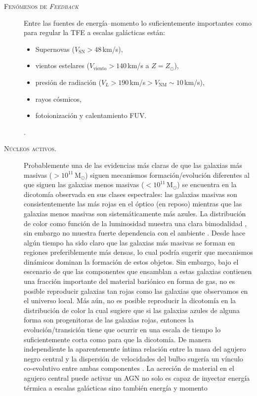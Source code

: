 \documentclass[xcolor=dvipsnames,4pt,hyperref={colorlinks,citecolor=black,linkcolor=black,urlcolor=black}]{beamer}
\begin{document}
\begin{frame}[allowframebreaks]{\textsc{Fenómenos de \emph{Feedback}}}
\begin{description}
Entre las fuentes de energía--momento lo suficientemente importantes como para regular la TFE a
escalas galácticas están:
%
\begin{itemize}
\item Supernovas ($V_\text{SN}>48\,$km/s),
\item vientos estelares ($V_\text{viento}>140\,$km/s a $Z=Z_\odot$),
\item presión de radiación ($V_L>190\,$km/s$>V_\text{NM}\sim10\,$km/s),
\item rayos cósmicos,
\item fotoionización y calentamiento FUV.
\end{itemize}
%
\citep[ver][para una revisión completa]{Krumholz2014}.
%
\item[\textsc{Núcleos activos.}] Probablemente una de las evidencias más claras de que las galaxias
más masivas ($>10^{11}\,$M$_\odot$) siguen mecanismos formación/evolución diferentes al que siguen
las galaxias menos masivas ($<10^{11}\,$M$_\odot$) se encuentra en la dicotomía observada en sus
clases espectrales: las galaxias masivas son consistentemente las más rojas en el óptico (en reposo)
mientras que las galaxias menos masivas son sistemáticamente más azules. La distribución de color
como función de la luminosidad muestra una clara bimodalidad \citep{Strateva2001, Baldry2004,
Balogh2004}, sin embargo no muestra fuerte dependencia con el ambiente \citep[medido usando la
densidad local, e.\,g.,][]{Balogh2004}. Desde hace algún tiempo ha sido claro que las galaxias más
masivas se forman en regiones preferiblemente más densas, lo cual podría sugerir que mecanismos
dinámicos dominan la formación de estos objetos. Sin embargo, bajo el escenario de que las
componentes que ensamblan a estas galaxias contienen una fracción importante del material bariónico
en forma de gas, no es posible reproducir galaxias tan rojas como las galaxias que observamos en el
universo local. Más aún, no es posible reproducir la dicotomía en la distribución de color la cual
sugiere que si las galaxias azules de alguna forma son progenitoras de las galaxias rojas, entonces
la evolución/transición tiene que ocurrir en una escala de tiempo lo suficientemente corta como para
que la dicotomía.
De manera independiente la aparentemente íntima relación entre la masa del agujero negro central y
la dispersión de velocidades del bulbo sugería un vínculo co-evolutivo entre ambas componentes
\citep{Ferrarese2000, Tremaine2002}. La acreción de material en el agujero central puede activar un
AGN no solo es capaz de inyectar energía térmica a escalas galácticas sino también energía y momento

\end{description}
\end{frame}
\end{document}
